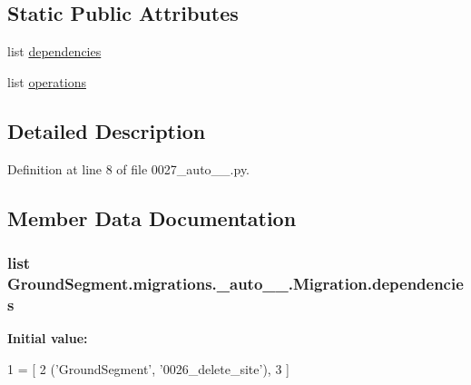 \subsection*{Static Public Attributes}
\begin{DoxyCompactItemize}
\item 
list \hyperlink{class_ground_segment_1_1migrations_1_10027__auto__20170115__1508_1_1_migration_a09e7dc8cb53200497987630b5304a636}{dependencies}
\item 
list \hyperlink{class_ground_segment_1_1migrations_1_10027__auto__20170115__1508_1_1_migration_ac353078e3c9d509dc20dc02024379438}{operations}
\end{DoxyCompactItemize}


\subsection{Detailed Description}


Definition at line 8 of file 0027\+\_\+auto\+\_\+\_.\+py.



\subsection{Member Data Documentation}
\hypertarget{class_ground_segment_1_1migrations_1_10027__auto__20170115__1508_1_1_migration_a09e7dc8cb53200497987630b5304a636}{}
\subsubsection[{dependencies}]{\setlength{\rightskip}{0pt plus 5cm}list Ground\+Segment.\+migrations.\+\_\+auto\+\_\+\_.\+Migration.\+dependencies\hspace{0.3cm}{\ttfamily [static]}}\label{class_ground_segment_1_1migrations_1_10027__auto__20170115__1508_1_1_migration_a09e7dc8cb53200497987630b5304a636}
{\bfseries Initial value\+:}
\begin{DoxyCode}
1 = [
2         (\textcolor{stringliteral}{'GroundSegment'}, \textcolor{stringliteral}{'0026\_delete\_site'}),
3     ]
\end{DoxyCode}


